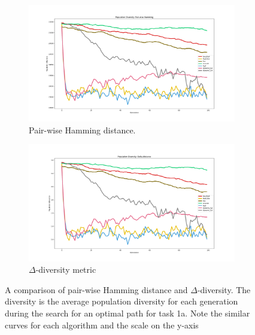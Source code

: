 \begin{figure}
    \label{fig:diversity_comparison}
    \begin{subfigure}[h]{0.49\linewidth}
        \label{fig:diversity_comparison:Hamming}
        \includegraphics[width=\linewidth]{Chapters/Experiments/search_algo/figures/diversity_showcase_hamming.png}
        \caption{Pair-wise Hamming distance.}
    \end{subfigure}
    \hfill
    \begin{subfigure}[h]{0.49\linewidth}
        \label{fig:diversity_comparison:homemade}
        \includegraphics[width=\linewidth]{Chapters/Experiments/search_algo/figures/diversity_showcase_homemade.png}
        \caption{\(\Delta\)-diversity metric}
    \end{subfigure}%
    \caption{A comparison of pair-wise Hamming distance and \(\Delta\)-diversity. The diversity is the average population diversity for each generation during the search for an optimal path for task 1a. Note the similar curves for each algorithm and the scale on the y-axis}
\end{figure}
